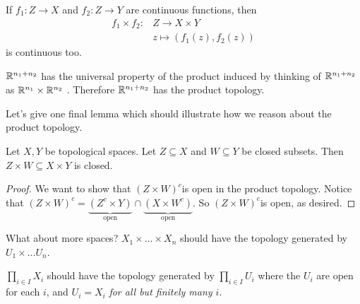 \documentclass[12pt, twosided]{article}
\begin{document}
\begin{cor}
  If \(f_1: Z \to X\) and \(f_2: Z \to Y\) are continuous functions, then
  \begin{align*}
    f_1 \times f_2: &Z \to X \times Y \\
                    &z \mapsto (f_1(z), f_2(z))
  \end{align*}
  is continuous too.
\end{cor}

\begin{exa}
  \(\mathbb{R}^{n_1 + n_2}\) has the universal property of the product induced by thinking of \(\mathbb{R}^{n_1 + n_2}\) as \(\mathbb{R}^{n_1} \times \mathbb{R}^{n_2}\) . Therefore \(\mathbb{R}^{n_1 + n_2}\) has the product topology.
\end{exa}
Let's give one final lemma which should illustrate how we reason about the product topology.

\begin{lm}
  Let \(X, Y\) be topological spaces. Let \(Z \subseteq X\) and \(W \subseteq Y\) be closed subsets. Then \(Z \times W \subseteq X \times Y\) is closed.
\end{lm}

\begin{proof}
  We want to show that \((Z \times W)^c\)is open in the product topology. Notice that \((Z \times W)^c = \underbrace{(Z^c \times Y)}_{\mathrm{open}} \cap \underbrace{(X \times W^c)}_{\mathrm{open}}\). So \((Z \times W)^c\)is open, as desired.
\end{proof}

\begin{ques}
  What about more spaces? \(X_1 \times \ldots \times X_n\) should have the topology generated by \(U_1 \times \ldots U_n\).

  \(\prod_{i \in I} X_i\) should have the topology generated by \(\prod_{i \in I} U_i\) where the \(U_i\) are open for each \(i\), and \(U_i = X_i\) \textit{for all but finitely many \(i\)}.
\end{ques}
\end{document}

